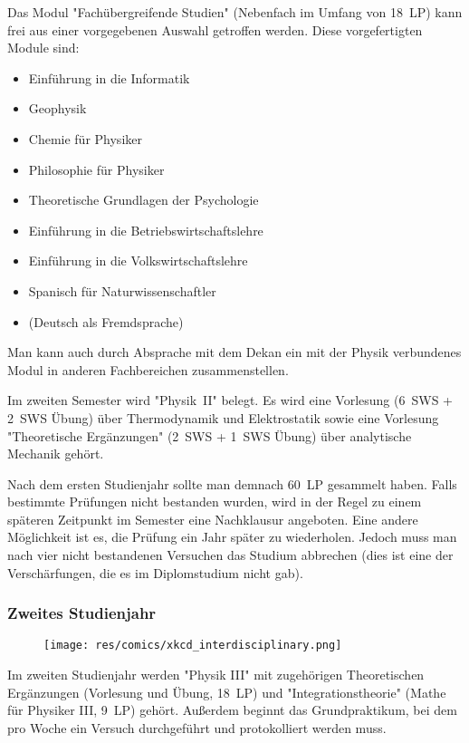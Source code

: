 \begin{multicols}{2}
\newpage

Das Modul "Fachübergreifende Studien" (Nebenfach im Umfang von \SI{18}{LP}) kann frei aus einer vorgegebenen Auswahl getroffen werden. Diese vorgefertigten Module sind:
\begin{itemize}[parsep=0.2cm]
\item Einführung in die Informatik
\item Geophysik
\item Chemie für Physiker
\item Philosophie für Physiker
\item Theoretische Grundlagen der Psychologie
\item Einführung in die Betriebswirtschaftslehre
\item Einführung in die Volkswirtschaftslehre
\item Spanisch für Naturwissenschaftler
\item (Deutsch als Fremdsprache)
\end{itemize}
Man kann auch durch Absprache mit dem Dekan ein mit der Physik verbundenes Modul in anderen Fachbereichen zusammenstellen.

Im zweiten Semester wird "Physik~II" belegt. Es wird eine Vorlesung (\SI{6}{SWS} + \SI{2}{SWS} Übung) über Thermodynamik und Elektrostatik sowie eine Vorlesung "Theoretische Ergänzungen" (\SI{2}{SWS} + \SI{1}{SWS} Übung) über analytische Mechanik gehört.

Nach dem ersten Studienjahr sollte man demnach \SI{60}{LP} gesammelt haben. Falls bestimmte Prüfungen nicht bestanden wurden, wird in der Regel zu einem späteren Zeitpunkt im Semester eine Nachklausur angeboten. Eine andere Möglichkeit ist es, die Prüfung ein Jahr später zu wiederholen. Jedoch muss man nach vier nicht bestandenen Versuchen das Studium abbrechen (dies ist eine der Verschärfungen, die es im Diplomstudium nicht gab).
\subsubsection*{Zweites Studienjahr}
\setlength{\intextsep}{0.1cm}
\begin{wrapfigure}[10]{r}[0.5cm]{0cm}
\texttt{[image: res/comics/xkcd\_interdisciplinary.png]}
\vspace{0.1cm}
\end{wrapfigure}
Im zweiten Studienjahr werden "Physik III" mit zugehörigen Theoretischen Ergänzungen (Vorlesung und Übung, \SI{18}{LP}) und "Integrationstheorie" (Mathe für Physiker III, \SI{9}{LP}) gehört. Außerdem beginnt das Grundpraktikum, bei dem pro Woche ein Versuch durchgeführt und protokolliert werden muss.


\end{multicols}
